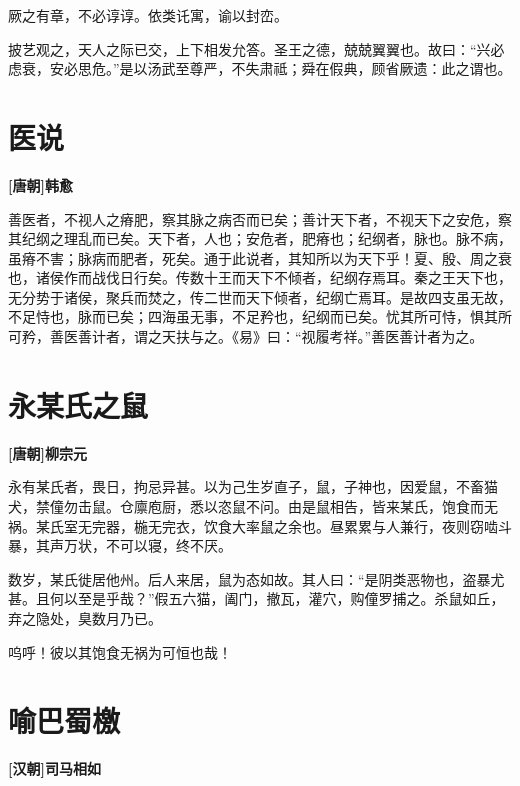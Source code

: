 \documentclass[UTF8,titlepage,oneside]{ctexbook}
\begin{document}
厥之有章，不必谆谆。依类讬寓，谕以封峦。


披艺观之，天人之际已交，上下相发允答。圣王之德，兢兢翼翼也。故曰：“兴必虑衰，安必思危。”是以汤武至尊严，不失肃祗；舜在假典，顾省厥遗：此之谓也。



\chapter*{医说}
\begin{center}
	\textbf{[唐朝]韩愈}
\end{center}

善医者，不视人之瘠肥，察其脉之病否而已矣；善计天下者，不视天下之安危，察其纪纲之理乱而已矣。天下者，人也；安危者，肥瘠也；纪纲者，脉也。脉不病，虽瘠不害；脉病而肥者，死矣。通于此说者，其知所以为天下乎！夏、殷、周之衰也，诸侯作而战伐日行矣。传数十王而天下不倾者，纪纲存焉耳。秦之王天下也，无分势于诸侯，聚兵而焚之，传二世而天下倾者，纪纲亡焉耳。是故四支虽无故，不足恃也，脉而已矣；四海虽无事，不足矜也，纪纲而已矣。忧其所可恃，惧其所可矜，善医善计者，谓之天扶与之。《易》曰：“视履考祥。”善医善计者为之。



\chapter*{永某氏之鼠}
\begin{center}
	\textbf{[唐朝]柳宗元}
\end{center}

永有某氏者，畏日，拘忌异甚。以为己生岁直子，鼠，子神也，因爱鼠，不畜猫犬，禁僮勿击鼠。仓廪庖厨，悉以恣鼠不问。由是鼠相告，皆来某氏，饱食而无祸。某氏室无完器，椸无完衣，饮食大率鼠之余也。昼累累与人兼行，夜则窃啮斗暴，其声万状，不可以寝，终不厌。

数岁，某氏徙居他州。后人来居，鼠为态如故。其人曰：“是阴类恶物也，盗暴尤甚。且何以至是乎哉？”假五六猫，阖门，撤瓦，灌穴，购僮罗捕之。杀鼠如丘，弃之隐处，臭数月乃已。

呜呼！彼以其饱食无祸为可恒也哉！


\chapter*{喻巴蜀檄}
\begin{center}
	\textbf{[汉朝]司马相如}
\end{center}
\end{document}
